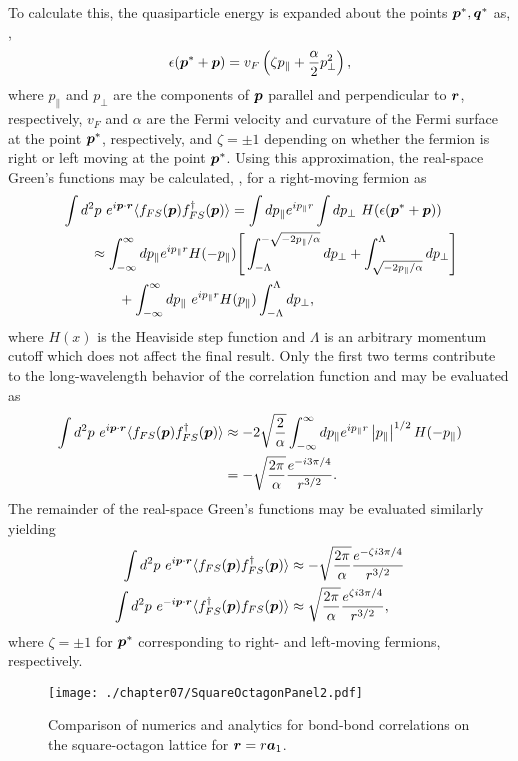 To calculate this, the quasiparticle energy is expanded about the points $\bm{p}^*, \bm{q}^*$ as, \eg,
%
\begin{equation}
	\epsilon(\bm{p}^* + \bm{p}) = v_F \left( \zeta p_{\parallel} + \frac{\alpha}{2} p_{\bot}^2 \right),
\end{equation}
%
where $p_{\parallel}$ and $p_{\bot}$ are the components of $\bm{p}$ parallel and perpendicular to $\bm{r}$, respectively, $v_F$ and $\alpha$ are the Fermi velocity and curvature of the Fermi surface at the point $\bm{p}^*$, respectively, and $\zeta = \pm 1$ depending on whether the fermion is right or left moving at the point $\bm{p}^*$.
Using this approximation, the real-space Green's functions may be calculated, \eg, for a right-moving fermion as
%
\begin{align}
	&\int d^2p~ e^{i\bm{p}\cdot\bm{r}} \langle f_{FS}(\bm{p}) f^{\dagger}_{FS}(\bm{p}) \rangle = \int dp_{\parallel} e^{i p_{\parallel} r} \int dp_{\bot}~ H(\epsilon(\bm{p}^* + \bm{p})) \nonumber\\
	&\qquad\approx \int_{-\infty}^{\infty} dp_{\parallel} e^{i p_{\parallel} r} H(-p_{\parallel})\Bigg[\int_{-\Lambda}^{-\sqrt{-2p_{\parallel}/\alpha}} dp_{\bot} + \int_{\sqrt{-2p_{\parallel}/\alpha}}^{\Lambda} dp_{\bot}\Bigg] \nonumber\\
	&\qquad\qquad+ \int_{-\infty}^{\infty} dp_{\parallel}~ e^{i p_{\parallel} r} H(p_{\parallel}) \int_{-\Lambda}^{\Lambda} dp_{\bot},
\end{align}
%
where $H(x)$ is the Heaviside step function and $\Lambda$ is an arbitrary momentum cutoff which does not affect the final result.
Only the first two terms contribute to the long-wavelength behavior of the correlation function and may be evaluated as~\cite{Lighthill1958}
%
\begin{align}
	\int d^2p~ e^{i\bm{p}\cdot\bm{r}} \langle f_{FS}(\bm{p}) f^{\dagger}_{FS}(\bm{p}) \rangle &\approx -2\sqrt{\frac{2}{\alpha}} \int_{-\infty}^{\infty} dp_{\parallel} e^{i p_{\parallel} r} \left| p_{\parallel} \right|^{1/2} H(-p_{\parallel}) \nonumber\\
	&= -\sqrt{\frac{2\pi}{\alpha}} \frac{e^{-i 3\pi/4}}{r^{3/2}}.
\end{align}
%
The remainder of the real-space Green's functions may be evaluated similarly yielding
%
\begin{align}
	\int d^2p~ e^{i\bm{p}\cdot\bm{r}} \langle f_{FS}(\bm{p}) f^{\dagger}_{FS}(\bm{p}) \rangle &\approx -\sqrt{\frac{2\pi}{\alpha}} \frac{e^{-\zeta i 3\pi/4}}{r^{3/2}} \nonumber\\
	\int d^2p~ e^{-i\bm{p}\cdot\bm{r}} \langle f^{\dagger}_{FS}(\bm{p}) f_{FS}(\bm{p}) \rangle &\approx \sqrt{\frac{2\pi}{\alpha}} \frac{e^{\zeta i 3\pi/4}}{r^{3/2}},
\end{align}
%
where $\zeta = \pm 1$ for $\bm{p}^*$ corresponding to right- and left-moving fermions, respectively.
%
\begin{figure}[tb]
	\centering
	\texttt{[image: ./chapter07/SquareOctagonPanel2.pdf]}
	\caption{
		Comparison of numerics and analytics for bond-bond correlations on the square-octagon lattice for $\bm{r} = r \bm{a}_1$.
	}
	\label{fig:chapter07_SquareOctagonPanel2}
\end{figure}
%

